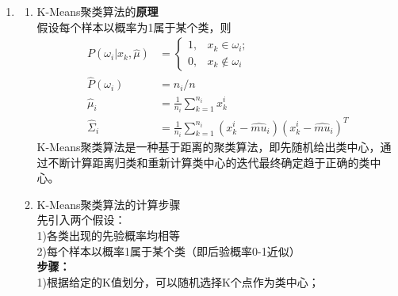 \documentclass[a4paper,11pt,onecolumn,oneside,UTF8]{article}
\begin{document}
\begin{enumerate}
\begin{enumerate}[(1)]
            \end{enumerate}
      \item
            \begin{enumerate}[(1)]
                  \item K-Means聚类算法的\textbf{原理}\\
                        假设每个样本以概率为1属于某个类，则\\
                        $$
                              \begin{aligned}
                                    P\left(\omega_i|x_k,\hat{\mu}\right) & =\left\{\begin{array}{ll}
                                          1, & x_k \in \omega_i;   \\
                                          0, & x_k \notin \omega_i
                                    \end{array}
                                    \right.                                                                                                                                  \\
                                    \hat{P}\left(\omega_i\right)         & = n_i/n                                                                                           \\
                                    \hat{\mu}_i                          & =\frac{1}{n_i}\sum\limits_{k=1}^{n_i}x_k^i                                                        \\
                                    \hat{\Sigma}_i                       & =\frac{1}{n_i}\sum\limits_{k=1}^{n_i}\left(x_k^i-\hat{mu}_i\right)\left(x_k^i-\hat{mu}_i\right)^T
                              \end{aligned}
                        $$
                        K-Means聚类算法是一种基于距离的聚类算法，即先随机给出类中心，通过不断计算距离归类和重新计算类中心的迭代最终确定趋于正确的类中心。
                  \item K-Means聚类算法的计算步骤\\
                        先引入两个假设：\\
                        1)各类出现的先验概率均相等\\
                        2)每个样本以概率1属于某个类（即后验概率0-1近似）\\
                        \textbf{步骤：}\\
                        1)根据给定的K值划分，可以随机选择K个点作为类中心；\\

\end{enumerate}
\end{enumerate}
\end{document}
